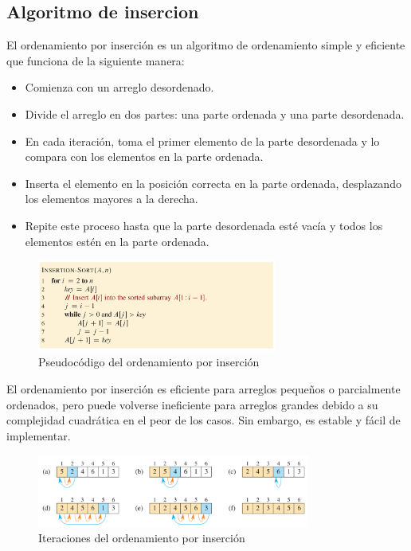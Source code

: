 \subsection{Algoritmo de insercion}
El ordenamiento por inserción es un algoritmo de ordenamiento simple y eficiente que funciona de la siguiente manera:
  \begin{itemize}
    \item Comienza con un arreglo desordenado.
    \item Divide el arreglo en dos partes: una parte ordenada y una parte desordenada.
    \item En cada iteración, toma el primer elemento de la parte desordenada y lo compara con los elementos en la parte ordenada.
    \item Inserta el elemento en la posición correcta en la parte ordenada, desplazando los elementos mayores a la derecha.
    \item Repite este proceso hasta que la parte desordenada esté vacía y todos los elementos estén en la parte ordenada.
  \end{itemize}

\begin{figure}[h]
  \centering
  \includegraphics[width=0.7\textwidth]{img/pseudocodigo_insercion.png}
  \caption{Pseudocódigo del ordenamiento por inserción}
  \label{fig:nombre_etiqueta}
\end{figure}  

El ordenamiento por inserción es eficiente para arreglos pequeños o parcialmente ordenados, pero puede volverse ineficiente para arreglos grandes debido a su complejidad cuadrática en el peor de los casos. Sin embargo, es estable y fácil de implementar.

\begin{figure}[h]
  \centering
  \includegraphics[width=0.8\textwidth]{img/iteraciones_insercion.png}
  \caption{Iteraciones del ordenamiento por inserción}
  \label{fig:nombre_etiqueta}
\end{figure}


